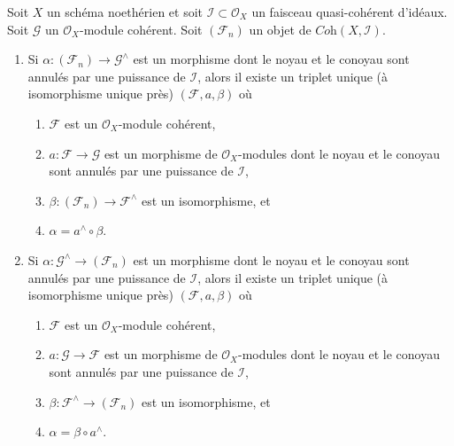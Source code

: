 \begin{lemma}
\label{lemma-existence-easy}
Soit $X$ un schéma noethérien et soit $\mathcal{I} \subset \mathcal{O}_X$
un faisceau quasi-cohérent d'idéaux. Soit $\mathcal{G}$ un
$\mathcal{O}_X$-module cohérent. Soit $(\mathcal{F}_n)$ un objet de
$\textit{Coh}(X, \mathcal{I})$.
\begin{enumerate}
\item Si $\alpha : (\mathcal{F}_n) \to \mathcal{G}^\wedge$ est
un morphisme dont le noyau et le conoyau sont annulés par une puissance de $\mathcal{I}$,
alors il existe un triplet unique (à isomorphisme unique près)
$(\mathcal{F}, a, \beta)$ où
\begin{enumerate}
\item $\mathcal{F}$ est un $\mathcal{O}_X$-module cohérent,
\item $a : \mathcal{F} \to \mathcal{G}$ est un morphisme de $\mathcal{O}_X$-modules dont
le noyau et le conoyau sont annulés par une puissance de $\mathcal{I}$,
\item $\beta : (\mathcal{F}_n) \to \mathcal{F}^\wedge$ est un isomorphisme, et
\item $\alpha = a^\wedge \circ \beta$.
\end{enumerate}
\item Si $\alpha : \mathcal{G}^\wedge \to (\mathcal{F}_n)$ est
un morphisme dont le noyau et le conoyau sont annulés par une puissance de $\mathcal{I}$,
alors il existe un triplet unique (à isomorphisme unique près)
$(\mathcal{F}, a, \beta)$ où
\begin{enumerate}
\item $\mathcal{F}$ est un $\mathcal{O}_X$-module cohérent,
\item $a : \mathcal{G} \to \mathcal{F}$ est un morphisme de $\mathcal{O}_X$-modules dont
le noyau et le conoyau sont annulés par une puissance de $\mathcal{I}$,
\item $\beta : \mathcal{F}^\wedge \to (\mathcal{F}_n)$ est un isomorphisme, et
\item $\alpha = \beta \circ a^\wedge$.
\end{enumerate}
\end{enumerate}
\end{lemma}

